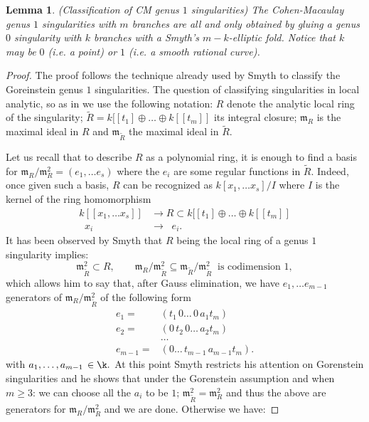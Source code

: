 \documentclass[11pt]{amsart}
\theoremstyle{plain}
\newtheorem{lem}[thm]{Lemma}
\theoremstyle{definition}
\begin{document}
\begin{lem}(Classification of CM genus $1$ singularities)
The Cohen-Macaulay genus $1$ singularities with $m$ branches are all and only obtained by gluing a genus $0$ singularity with $k$ branches with a Smyth's $m-k$-elliptic fold.
Notice that $k$ may be $0$ (i.e. a point) or $1$ (i.e. a smooth rational curve).
\end{lem}
\begin{proof}
The proof follows the technique already used by Smyth \cite[Appendix~A]{SMY1} to classify the Goreinstein genus $1$ singularities. The question of classifying singularities in local analytic, so as in \cite[Appendix~A]{SMY1} we use the following notation:
$R$ denote the analytic local ring of the singularity; 
$\widetilde{R}=k[[t_1]\oplus\dots\oplus k[[t_m]]$ its integral closure; $\mathfrak{m}_R$ is the maximal ideal in $R$  and $\mathfrak{m}_{\widetilde{R}}$ the maximal ideal in $\widetilde{R}.$

Let us recall that to describe $R$ as a polynomial ring, it is enough to find a basis for $\mathfrak{m}_R/\mathfrak{m}^2_R=(e_1,\dots e_s)$ where the $e_i$ are some regular functions in $\widetilde{R}.$ Indeed, once given such a basis, $R$ can be recognized as $k[x_1,\dots x_s]/I$ where $I$ is the kernel of the ring homomorphism
\begin{align}\label{eq:singularity}
k[[x_1,\dots x_s]]&\rightarrow R\subset k[[t_1]\oplus\dots\oplus k[[t_m]]\\
\;\;x_i\;\; &\rightarrow \;\; e_i.\;\;
\end{align}
It has been observed by Smyth \cite[Proposition~A.3]{SMY1} that $R$ being the local ring of a genus $1$ singularity implies:
\[\mathfrak{m}^2_{\widetilde{R}}\subset R,\qquad \mathfrak{m}_R/\mathfrak{m}^2_{\widetilde{R}}\subseteq \mathfrak{m}_{\widetilde{R}}/\mathfrak{m}^2_{\widetilde{R}}\;\;\text{is codimension $1$},\]
which allows him to say that, after Gauss elimination, we have $e_1,\dots e_{m-1}$ generators of $\mathfrak{m}_R/\mathfrak{m}^2_{\widetilde{R}}$ of the following form
\begin{align*}
e_1=& (t_1 \,0\dots\,0\, a_1 t_m)\\
e_2=&( 0\,t_2\,0\dots\, a_2 t_m)\\
&\dots\\
e_{m-1}=&(0\dots\,t_{m-1}\, a_{m-1}t_m ).
\end{align*}
with $a_{1},\dots, a_{m-1}\,\in \k.$ At this point Smyth restricts his attention on Gorenstein singularities and he shows that under the Gorenstein assumption and when $m\geq 3$: we can choose all the $a_i$ to be $1$; $\mathfrak{m}^2_{\widetilde{R}}=\mathfrak{m}^2_{R}$ and thus the above are generators for $\mathfrak{m}_R/\mathfrak{m}^2_R$ and we are  done.
Otherwise we have:


\end{proof}
\end{document}

